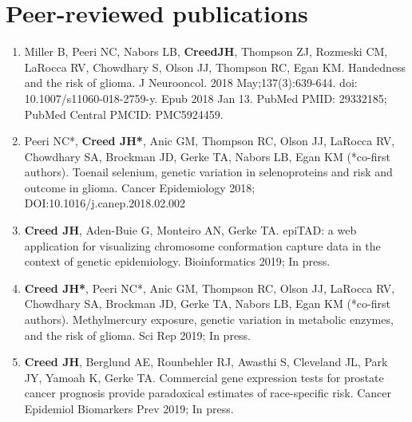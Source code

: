 \documentclass[11pt, a4paper]{article} %
\newcommand{\years}[1]{\marginnote{\scriptsize \raise .3ex\hbox{#1}}} %
\begin{document}

\section*{Peer-reviewed publications}
\begin{enumerate}[leftmargin=*]

\item{} Miller B, Peeri NC, Nabors LB, {\bf CreedJH}, Thompson ZJ, Rozmeski CM, LaRocca RV, Chowdhary S, Olson JJ, Thompson RC, Egan KM. Handedness and the risk of glioma. J
Neurooncol. 2018 May;137(3):639-644. doi: 10.1007/s11060-018-2759-y. Epub 2018
Jan 13. PubMed PMID: 29332185; PubMed Central PMCID: PMC5924459.

\item{} Peeri NC*, {\bf Creed JH*}, Anic GM, Thompson RC, Olson JJ, LaRocca RV, Chowdhary SA, Brockman JD, Gerke TA, Nabors LB, Egan KM (*co-first authors). Toenail selenium, genetic variation in selenoproteins and risk and outcome in glioma. Cancer Epidemiology 2018; DOI:10.1016/j.canep.2018.02.002

\item{} {\bf Creed JH}, Aden-Buie G, Monteiro AN, Gerke TA. epiTAD: a web application for visualizing  chromosome conformation capture data in the context of genetic epidemiology. Bioinformatics 2019; In press.

\item{} {\bf Creed JH*}, Peeri NC*, Anic GM, Thompson RC, Olson JJ, LaRocca RV, Chowdhary SA, Brockman JD, Gerke TA, Nabors LB, Egan KM (*co-first authors). Methylmercury exposure, genetic variation in metabolic enzymes, and the risk of glioma. Sci Rep 2019; In press. 

\item{} {\bf Creed JH}, Berglund AE, Rounbehler RJ, Awasthi S, Cleveland JL, Park JY, Yamoah K, Gerke TA. Commercial gene expression tests for prostate cancer prognosis provide paradoxical estimates of race-specific risk. Cancer Epidemiol Biomarkers Prev 2019; In press.
\end{enumerate}
\end{document}
